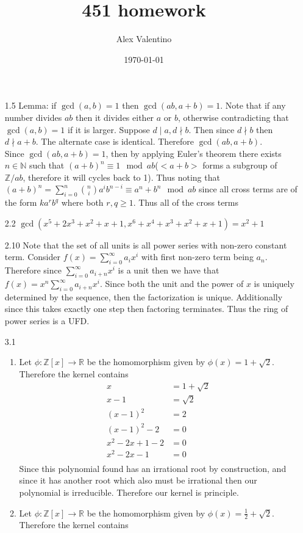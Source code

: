 \documentclass[12pt, letterpaper]{article}
\date{\today}
\author{Alex Valentino}
\title{451 homework}
\newcommand{\Z}{\mathbb{Z}}
\newcommand{\N}{\mathbb{N}}
\newcommand{\R}{\mathbb{R}}
\begin{document}
\begin{enumerate}
	\item[1.5] Lemma: if $\gcd(a,b) = 1$ then $\gcd(ab,a+b) = 1$.  Note that if 
	any number divides $ab$ then it divides either $a$ or $b$, otherwise contradicting that $\gcd(a,b) = 1$ if it is larger.  Suppose $d \mid a, d \nmid b$.
	Then since $d \nmid b$ then $d \nmid a + b$.  The alternate case is identical.
	Therefore $\gcd(ab,a+b)$.\\
	Since $\gcd(ab,a+b) = 1$, then by applying Euler's theorem there exists $n \in \N$ 	such that $(a+b)^n \equiv 1 \mod{ab}$($<a+b>$ forms a subgroup of $\Z/ab$, 
	therefore it will cycles back to 1).  Thus noting that $(a+b)^n = \sum_{i=0}^n \binom{n}{i}a^i b^{n-i} \equiv a^n + b^n \mod{ab}$ since all cross terms are of the 
	form $ka^r b^q$ where both $r,q \geq 1$.  Thus all of the cross terms 
	\item[2.2] $\gcd(x^5 + 2x^3+x^2 + x + 1, x^6 + x^4 + x^3 + x^2 + x + 1) = x^2 + 1$  
	\item[2.10]  Note that the set of all units is all power series with non-zero 
	constant term.  Consider $f(x) = \sum_{i=0}^\infty a_i x^i$ with first non-zero 
	term being $a_n$.   Therefore since $\sum_{i=0}^\infty a_{i+n} x^i$ is a unit 
	then we have that $f(x) = x^n\sum_{i=0}^\infty a_{i+n} x^i$.  Since both the 
	unit and the power of $x$ is uniquely determined by the sequence, then the 
	factorization is unique.  Additionally since this takes exactly one step then 
	factoring terminates.  Thus the ring of power series is a UFD.  
	\item[3.1]
	\begin{enumerate}
		\item Let $\phi: \Z[x] \to \R$ be the homomorphism given by $\phi(x) = 1 + \sqrt{2}$.  Therefore the kernel contains 
		\begin{align*}
			x &= 1 + \sqrt{2}\\
			x-1 &= \sqrt{2}\\
			(x-1)^2 &= 2\\
			(x-1)^2 - 2 &= 0\\
			x^2 -2x + 1 - 2 &= 0\\
			x^2 -2x -1 &= 0\\
		\end{align*}
		Since this polynomial found has an irrational root by construction, and 
		since it has another root which also must be irrational then our
		polynomial is irreducible.  Therefore our kernel is principle.  
		\item Let $\phi: \Z[x] \to \R$ be the homomorphism given by $\phi(x) = \frac{1}{2} + \sqrt{2}$.  Therefore the kernel contains 

\end{enumerate}
\end{enumerate}
\end{document}
